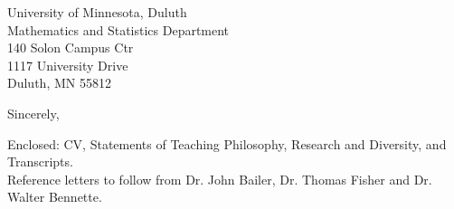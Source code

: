 \documentclass[11pt]{letter}\usepackage[]{graphicx}\usepackage[]{color}
\begin{document}
\begin{letter}{University of Minnesota, Duluth\\
Mathematics and Statistics Department\\
140 Solon Campus Ctr\\
1117 University Drive\\
Duluth, MN 55812
}
\addtolength{\medskipamount}{-1\medskipamount}
\closing{Sincerely,}


Enclosed: CV, Statements of Teaching Philosophy, Research and Diversity, and Transcripts. \\
Reference letters to follow from Dr. John Bailer, Dr. Thomas Fisher and Dr. Walter Bennette.


\end{letter}
\end{document}
